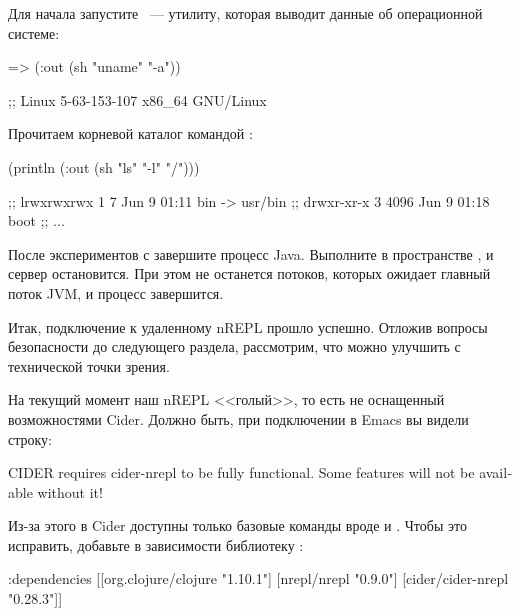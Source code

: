 Для начала запустите ~--- утилиту, которая выводит данные об операционной системе:

\begin{english}
  \begin{clojure}
=> (:out (sh "uname" "-a"))

;; Linux 5-63-153-107 x86_64 GNU/Linux
  \end{clojure}
\end{english}

Прочитаем корневой каталог командой :

\begin{english}
  \begin{text}
(println (:out (sh "ls" "-l" "/")))

;; lrwxrwxrwx   1    7 Jun  9 01:11 bin -> usr/bin
;; drwxr-xr-x   3 4096 Jun  9 01:18 boot
;; ...
  \end{text}
\end{english}

После экспериментов с  завершите процесс Java. Выполните  в пространстве , и сервер остановится. При этом не останется потоков, которых ожидает главный поток JVM, и процесс завершится.

Итак, подключение к удаленному nREPL прошло успешно. Отложив вопросы безопасности до следующего раздела, рассмотрим, что можно улучшить с технической точки зрения.

На текущий момент наш nREPL <<голый>>, то есть не оснащенный возможностями Cider. Должно быть, при подключении в Emacs вы видели строку:

\begin{english}
  \begin{text}
CIDER requires cider-nrepl to be fully functional.
Some features will not be available without it!
  \end{text}
\end{english}

Из-за этого в Cider доступны только базовые команды вроде  и . Чтобы это исправить, добавьте в зависимости библиотеку :

\begin{english}
  \begin{clojure}
  :dependencies
  [[org.clojure/clojure "1.10.1"]
   [nrepl/nrepl "0.9.0"]
   [cider/cider-nrepl "0.28.3"]]
  \end{clojure}
\end{english}

